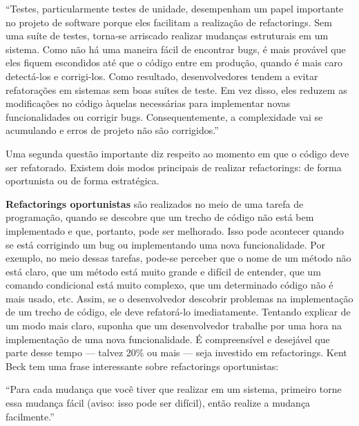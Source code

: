 \documentclass[
  11pt,
  twoside]{book}
\renewenvironment{quote}{\centering \vspace{1.5ex} \begin{tcolorbox}[colback=backcolor, width=4.9in]}{\end{tcolorbox}}
\begin{document}

\begin{quote}
``Testes, particularmente testes de unidade, desempenham um papel
importante no projeto de software porque eles facilitam a realização de
refactorings. Sem uma suíte de testes, torna-se arriscado realizar
mudanças estruturais em um sistema. Como não há uma maneira fácil de
encontrar bugs, é mais provável que eles fiquem escondidos até que o
código entre em produção, quando é mais caro detectá-los e corrigi-los.
Como resultado, desenvolvedores tendem a evitar refatorações em sistemas
sem boas suítes de teste. Em vez disso, eles reduzem as modificações no
código àquelas necessárias para implementar novas funcionalidades ou
corrigir bugs. Consequentemente, a complexidade vai se acumulando e
erros de projeto não são corrigidos.''
\end{quote}

Uma segunda questão importante diz respeito ao momento em que o código
deve ser refatorado. Existem dois modos principais de realizar
refactorings: de forma oportunista ou de forma estratégica.

 \textbf{Refactorings oportunistas} são
realizados no meio de uma tarefa de programação, quando se descobre que
um trecho de código não está bem implementado e que, portanto, pode ser
melhorado. Isso pode acontecer quando se está corrigindo um bug ou
implementando uma nova funcionalidade. Por exemplo, no meio dessas
tarefas, pode-se perceber que o nome de um método não está claro, que um
método está muito grande e difícil de entender, que um comando
condicional está muito complexo, que um determinado código não é mais
usado, etc. Assim, se o desenvolvedor descobrir problemas na
implementação de um trecho de código, ele deve refatorá-lo
imediatamente. Tentando explicar de um modo mais claro, suponha que um
desenvolvedor trabalhe por uma hora na implementação de uma nova
funcionalidade. É compreensível e desejável que parte desse tempo ---
talvez 20\% ou mais --- seja investido em refactorings. Kent Beck tem
uma frase interessante sobre refactorings oportunistas:


\begin{quote}
``Para cada mudança que você tiver que realizar em um sistema, primeiro
torne essa mudança fácil (aviso: isso pode ser difícil), então realize a
mudança facilmente.''
\end{quote}
\end{document}
